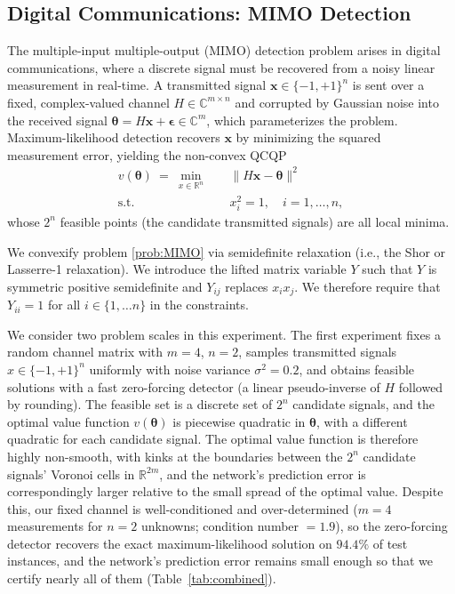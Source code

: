 \documentclass[10pt]{article} %
\theoremstyle{plain}
\theoremstyle{definition}
\theoremstyle{remark}
\begin{document}
\subsection{Digital Communications: MIMO Detection}

The multiple-input multiple-output (MIMO) detection problem arises in digital communications, where a discrete signal must be recovered from a noisy linear measurement in real-time. A transmitted signal $\mathbf{x} \in \{-1, +1\}^n$ is sent over a fixed, complex-valued channel $H \in \mathbb{C}^{m \times n}$ and corrupted by Gaussian noise into the received signal $\bm{\theta} = H \mathbf{x} + \bm{\epsilon} \in \mathbb{C}^{m}$, which parameterizes the problem. Maximum-likelihood detection recovers $\mathbf{x}$ by minimizing the squared measurement error, yielding the non-convex QCQP
\begin{equation}
\begin{aligned}
    v(\bm{\theta}) ~=~ \min_{x \in \mathbb{R}^n} \quad & \|H \mathbf{x} - \bm{\theta}\|^2 \\
    \text{s.t.} \quad & x_i^2 = 1, \quad i = 1, \ldots, n,
\end{aligned}
\label{prob:MIMO}
\end{equation}
whose $2^n$ feasible points (the candidate transmitted signals) are all local minima.

We convexify problem \cref{prob:MIMO}{}{} via semidefinite relaxation (i.e., the Shor or Lasserre-1 relaxation). We introduce the lifted matrix variable $Y$ such that $Y$ is symmetric positive semidefinite and $Y_{ij}$ replaces $x_i x_j$. We therefore require that $Y_{ii} = 1$ for all $i \in \{1, \dots n\}$ in the constraints.

We consider two problem scales in this experiment. The first experiment fixes a random channel matrix with $m = 4$, $n = 2$, samples transmitted signals $x \in \{-1, +1\}^n$ uniformly with noise variance $\sigma^2 = 0.2$, and obtains feasible solutions with a fast zero-forcing detector (a linear pseudo-inverse of $H$ followed by rounding). The feasible set is a discrete set of $2^n$ candidate signals, and the optimal value function $v(\bm{\theta})$ is piecewise quadratic in $\bm{\theta}$, with a different quadratic for each candidate signal. The optimal value function is therefore highly non-smooth, with kinks at the boundaries between the $2^n$ candidate signals' Voronoi cells in $\mathbb{R}^{2m}$, and the network's prediction error is correspondingly larger relative to the small spread of the optimal value. Despite this, our fixed channel is well-conditioned and over-determined ($m=4$ measurements for $n=2$ unknowns; condition number $= 1.9$), so the zero-forcing detector recovers the exact maximum-likelihood solution on $94.4\%$ of test instances, and the network's prediction error remains small enough so that we certify nearly all of them (Table~\ref{tab:combined}).
\end{document}
